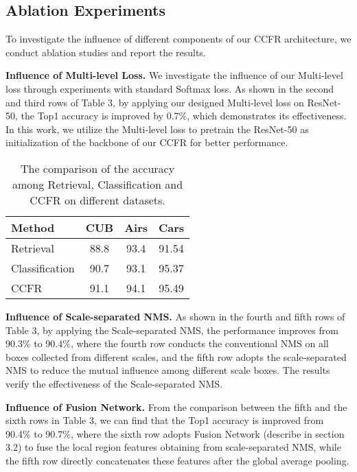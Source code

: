\documentclass[10pt,twocolumn,letterpaper]{article}
\begin{document}
\subsection{Ablation Experiments}
To investigate the influence of different components of our CCFR architecture, we conduct ablation studies and report the results. 



\textbf{Influence of Multi-level Loss.}
We investigate the influence of our Multi-level loss through experiments with standard Softmax loss. As shown in the second and third rows of Table 3, by applying our designed Multi-level loss on ResNet-50, the Top1 accuracy is improved by 0.7\%, which demonstrates its effectiveness. 
In this work, we utilize the Multi-level loss to pretrain the ResNet-50 as initialization of the backbone of our CCFR for better performance. 



\begin{table}
\begin{center}
\begin{tabular}{|l|c|c|c|} 
\hline
Method & CUB  & Airs & Cars  \\
\hline
Retrieval  &  88.8 & 93.4 & 91.54 \\
\hline 
Classification & 90.7 & 93.1 & 95.37 \\
\hline 
CCFR & 91.1 & 94.1 & 95.49 \\
\hline 
\end{tabular}
\end{center}
\caption{The comparison of the accuracy among Retrieval, Classification and CCFR on different datasets.}
\end{table}
\textbf{Influence of Scale-separated NMS.}
As shown in the fourth and fifth rows of Table 3, by applying the Scale-separated NMS, the performance improves from 90.3\% to 90.4\%, where the fourth row conducts the conventional NMS on all boxes collected from different scales, and the fifth row adopts the scale-separated NMS to reduce the mutual influence among different scale boxes.
The results verify the effectiveness of the Scale-separated NMS.


\textbf{Influence of Fusion Network.}
From the comparison between the fifth and the sixth rows in Table 3, we can find that the Top1 accuracy is improved from 90.4\% to 90.7\%, where 
the sixth row adopts Fusion Network (describe in section 3.2) to fuse the local region features obtaining from scale-separated NMS, while the fifth row directly concatenates these features after the global average pooling.
\end{document}
